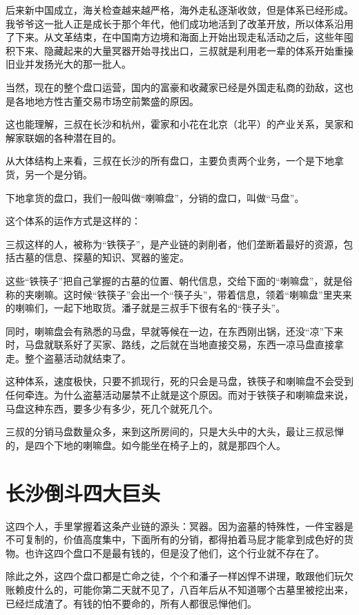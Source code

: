后来新中国成立，海关检查越来越严格，海外走私逐渐收敛，但是体系已经形成。我爷爷这一批人正是成长于那个年代，他们成功地活到了改革开放，所以体系沿用了下来。从文革结束，在中国南方边境和海面上开始出现走私活动之后，这些年囤积下来、隐藏起来的大量冥器开始寻找出口，三叔就是利用老一辈的体系开始重操旧业并发扬光大的那一批人。

当然，现在的整个盘口运营，国内的富豪和收藏家已经是外国走私商的劲敌，这也是各地地方性古董交易市场空前繁盛的原因。

这也能理解，三叔在长沙和杭州，霍家和小花在北京（北平）的产业关系，吴家和解家联姻的各种潜在目的。

从大体结构上来看，三叔在长沙的所有盘口，主要负责两个业务，一个是下地拿货，另一个是分销。

下地拿货的盘口，我们一般叫做“喇嘛盘”，分销的盘口，叫做“马盘”。

这个体系的运作方式是这样的：

三叔这样的人，被称为“铁筷子”，是产业链的剥削者，他们垄断着最好的资源，包括古墓的信息、探墓的知识、冥器的鉴定。

这些“铁筷子”把自己掌握的古墓的位置、朝代信息，交给下面的“喇嘛盘”，就是俗称的夹喇嘛。这时候“铁筷子”会出一个“筷子头”，带着信息，领着“喇嘛盘”里夹来的喇嘛们，一起下地取货。潘子就是三叔手下很有名的“筷子头”。

同时，喇嘛盘会有熟悉的马盘，早就等候在一边，在东西刚出锅，还没“凉”下来时，马盘就联系好了买家、路线，之后就在当地直接交易，东西一凉马盘直接拿走。整个盗墓活动就结束了。

这种体系，速度极快，只要不抓现行，死的只会是马盘，铁筷子和喇嘛盘不会受到任何牵连。为什么盗墓活动屡禁不止就是这个原因。而对于铁筷子和喇嘛盘来说，马盘这种东西，要多少有多少，死几个就死几个。

三叔的分销马盘数量众多，来到这所房间的，只是大头中的大头，最让三叔忌惮的，是四个下地的喇嘛盘。如今能坐在椅子上的，就是那四个人。

\chapter{长沙倒斗四大巨头}

这四个人，手里掌握着这条产业链的源头：冥器。因为盗墓的特殊性，一件宝器是不可复制的，价值高度集中，下面所有的分销，都得拍着马屁才能拿到成色好的货物。也许这四个盘口不是最有钱的，但是没了他们，这个行业就不存在了。

除此之外，这四个盘口都是亡命之徒，个个和潘子一样凶悍不讲理，敢跟他们玩欠账赖皮什么的，可能你第二天就不见了，八百年后从不知道哪个古墓里被挖出来，已经烂成渣了。有钱的怕不要命的，所有人都很忌惮他们。

